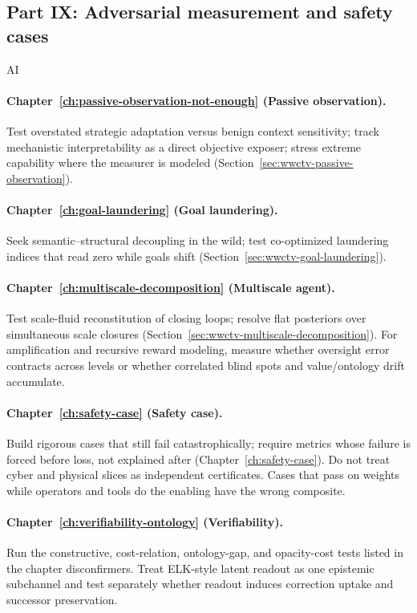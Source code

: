 \subsection{Part IX: Adversarial measurement and safety cases}
\begin{authbar}{AI}
\paragraph{Chapter~\ref{ch:passive-observation-not-enough} (Passive observation).}
Test overstated strategic adaptation versus benign context sensitivity; track mechanistic interpretability as a direct objective exposer; stress extreme capability where the measurer is modeled (Section~\ref{sec:wwctv-passive-observation}).

\paragraph{Chapter~\ref{ch:goal-laundering} (Goal laundering).}
Seek semantic--structural decoupling in the wild; test co-optimized laundering indices that read zero while goals shift (Section~\ref{sec:wwctv-goal-laundering}).

\paragraph{Chapter~\ref{ch:multiscale-decomposition} (Multiscale agent).}
Test scale-fluid reconstitution of closing loops; resolve flat posteriors over simultaneous scale closures (Section~\ref{sec:wwctv-multiscale-decomposition}). For amplification and recursive reward modeling, measure whether oversight error contracts across levels or whether correlated blind spots and value/ontology drift accumulate.

\paragraph{Chapter~\ref{ch:safety-case} (Safety case).}
Build rigorous cases that still fail catastrophically; require metrics whose failure is forced before loss, not explained after (Chapter~\ref{ch:safety-case}).
Do not treat cyber and physical slices as independent certificates. Cases that pass on weights while operators and tools do the enabling have the wrong composite.

\paragraph{Chapter~\ref{ch:verifiability-ontology} (Verifiability).}
Run the constructive, cost-relation, ontology-gap, and opacity-cost tests listed in the chapter disconfirmers. Treat ELK-style latent readout as one epistemic subchannel and test separately whether readout induces correction uptake and successor preservation.


\end{authbar}
